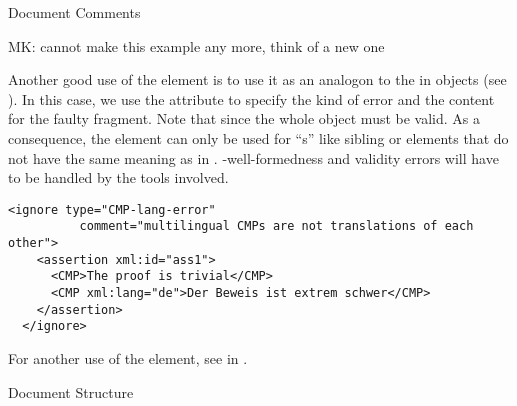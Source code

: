\begin{omgroup}[id=omdoc-infrastructure,short=Document Infrastructure]
\begin{omgroup}[id=comment]{Document Comments}
\begin{module}[id=comments]
\begin{oldpart}{MK: cannot make this example any more, think of a new one}
\begin{example}
  Another good use of the {} element is to use it as an analogon to the
  {} in {\openmath} objects (see {}). In
  this case, we use the {} attribute to specify the kind of error
  and the content for the faulty {\omdoc} fragment. Note that since the whole object must
  be {\xml} valid. As a consequence, the {} element can only be used for
  ``{s}'' like sibling {} or {}
  elements that do not have the same meaning as in
  {}. {\xml}-well-formedness and validity errors will have to be
  handled by the {\xml} tools involved.

\begin{lstlisting}[label=lst:ignore-error,
  caption={Marking up Mathematical Errors Using {\element{ignore}}},
  numbers=none,index={ignore}]
  <ignore type="CMP-lang-error" 
          comment="multilingual CMPs are not translations of each other">
    <assertion xml:id="ass1">
      <CMP>The proof is trivial</CMP>
      <CMP xml:lang="de">Der Beweis ist extrem schwer</CMP>
    </assertion>
  </ignore>
\end{lstlisting}    
For another use of the {} element, see {} in
{}.
\end{example}
\end{oldpart}
\end{module}
\end{omgroup}

\begin{omgroup}[id=sectioning]{Document Structure}
\begin{module}[id=sectioning]


\end{module}
\end{omgroup}
\end{omgroup}
